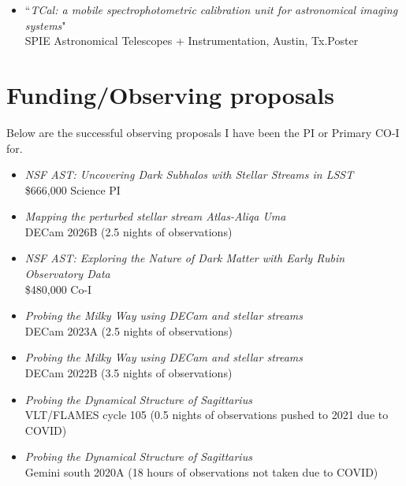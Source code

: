 \documentclass[11pt,letterpaper, sans]{moderncv}        %
\begin{document}
\begin{itemize} [itemsep=1pt, leftmargin=28pt]

\item[2018] ``\textit{TCal: a mobile spectrophotometric calibration unit for astronomical imaging systems}"\\
SPIE Astronomical Telescopes + Instrumentation, Austin, Tx.\hfill Poster

\end{itemize}

\section{Funding/Observing proposals}
Below are the successful observing proposals I have been the PI or Primary CO-I for.
\begin{itemize}[itemsep=1pt, leftmargin=28pt]
    \item [2026] \emph{NSF AST: Uncovering Dark Subhalos with Stellar Streams in LSST}\\ \$666,000 Science PI
    \item [2026] \emph{Mapping the perturbed stellar stream Atlas-Aliqa Uma}\\ DECam 2026B (2.5 nights of observations)
    \item [2022] \emph{NSF AST: Exploring the Nature of Dark Matter with Early Rubin Observatory Data}\\ \$480,000 Co-I
    \item [2022] \emph{Probing the Milky Way using DECam and stellar streams}\\ DECam 2023A (2.5 nights of observations)
    \item [2022] \emph{Probing the Milky Way using DECam and stellar streams}\\ DECam 2022B (3.5 nights of observations)
    \item [2019] \emph{Probing the Dynamical Structure of Sagittarius}\\ VLT/FLAMES cycle 105 (0.5 nights of observations pushed to 2021 due to COVID)
    \item [2019] \emph{Probing the Dynamical Structure of Sagittarius}\\ Gemini south 2020A (18 hours of observations not taken due to COVID)
\end{itemize}
\end{document}
